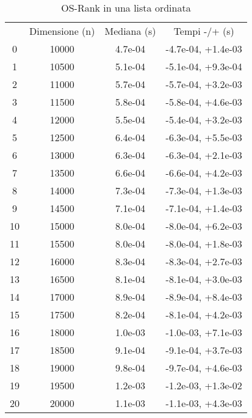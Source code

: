 \begin{table}
\centering
\caption{OS-Rank in una lista ordinata}
\label{OS-Rank in una lista ordinata}
\begin{adjustbox}{width=1\textwidth/2}
\begin{tabular}{|c|c|c|c|}
\hline
 & Dimensione (n) & Mediana (s) & Tempi -/+ (s) \\
0 & 10000 & 4.7e-04 & -4.7e-04, +1.4e-03 \\
\cline{1-4}
1 & 10500 & 5.1e-04 & -5.1e-04, +9.3e-04 \\
\cline{1-4}
2 & 11000 & 5.7e-04 & -5.7e-04, +3.2e-03 \\
\cline{1-4}
3 & 11500 & 5.8e-04 & -5.8e-04, +4.6e-03 \\
\cline{1-4}
4 & 12000 & 5.5e-04 & -5.4e-04, +3.2e-03 \\
\cline{1-4}
5 & 12500 & 6.4e-04 & -6.3e-04, +5.5e-03 \\
\cline{1-4}
6 & 13000 & 6.3e-04 & -6.3e-04, +2.1e-03 \\
\cline{1-4}
7 & 13500 & 6.6e-04 & -6.6e-04, +4.2e-03 \\
\cline{1-4}
8 & 14000 & 7.3e-04 & -7.3e-04, +1.3e-03 \\
\cline{1-4}
9 & 14500 & 7.1e-04 & -7.1e-04, +1.4e-03 \\
\cline{1-4}
10 & 15000 & 8.0e-04 & -8.0e-04, +6.2e-03 \\
\cline{1-4}
11 & 15500 & 8.0e-04 & -8.0e-04, +1.8e-03 \\
\cline{1-4}
12 & 16000 & 8.3e-04 & -8.3e-04, +2.7e-03 \\
\cline{1-4}
13 & 16500 & 8.1e-04 & -8.1e-04, +3.0e-03 \\
\cline{1-4}
14 & 17000 & 8.9e-04 & -8.9e-04, +8.4e-03 \\
\cline{1-4}
15 & 17500 & 8.2e-04 & -8.1e-04, +4.2e-03 \\
\cline{1-4}
16 & 18000 & 1.0e-03 & -1.0e-03, +7.1e-03 \\
\cline{1-4}
17 & 18500 & 9.1e-04 & -9.1e-04, +3.7e-03 \\
\cline{1-4}
18 & 19000 & 9.8e-04 & -9.7e-04, +4.6e-03 \\
\cline{1-4}
19 & 19500 & 1.2e-03 & -1.2e-03, +1.3e-02 \\
\cline{1-4}
20 & 20000 & 1.1e-03 & -1.1e-03, +4.3e-03 \\
\cline{1-4}
\end{tabular}
\end{adjustbox}
\end{table}

